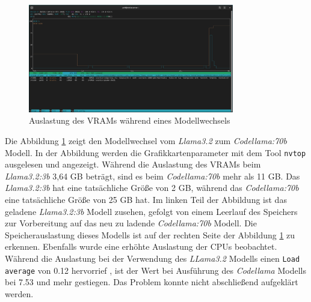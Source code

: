 \begin{figure}[!ht]
	\includegraphics[width=0.8\textwidth]{content/chapter_lessons_learned/images/nvtop_model_change.eps}
	\centering
	\caption{Auslastung des VRAMs während eines Modellwechsels}
	\label{img:bash_nvtop_model_change}
\end{figure}

Die Abbildung \ref{img:bash_nvtop_model_change} zeigt den Modellwechsel vom \textit{Llama3.2} zum \textit{Codellama:70b} Modell. In der Abbildung werden die Grafikkartenparameter mit dem Tool \texttt{nvtop} ausgelesen und angezeigt. Während die Auslastung des VRAMs beim \textit{Llama3.2:3b} 3,64 GB beträgt, sind es beim \textit{Codellama:70b} mehr als 11 GB. Das \textit{Llama3.2:3b} hat eine tatsächliche Größe von 2 GB, während das \textit{Codellama:70b} eine tatsächliche Größe von 25 GB hat. Im linken Teil der Abbildung ist das geladene \textit{Llama3.2:3b} Modell zusehen, gefolgt von einem Leerlauf des Speichers zur Vorbereitung auf das neu zu ladende \textit{Codellama:70b} Modell. Die Speicherauslastung dieses Modells ist auf der rechten Seite der Abbildung \ref{img:bash_nvtop_model_change} zu erkennen. Ebenfalls wurde eine erhöhte Auslastung der CPUs beobachtet. Während die Auslastung bei der Verwendung des \textit{LLama3.2} Modells einen \texttt{Load average} von 0.12 hervorrief
, ist der Wert bei Ausführung des \textit{Codellama} Modells bei 7.53 und mehr gestiegen.
Das Problem konnte nicht abschließend aufgeklärt werden.\vspace{0.2cm}


